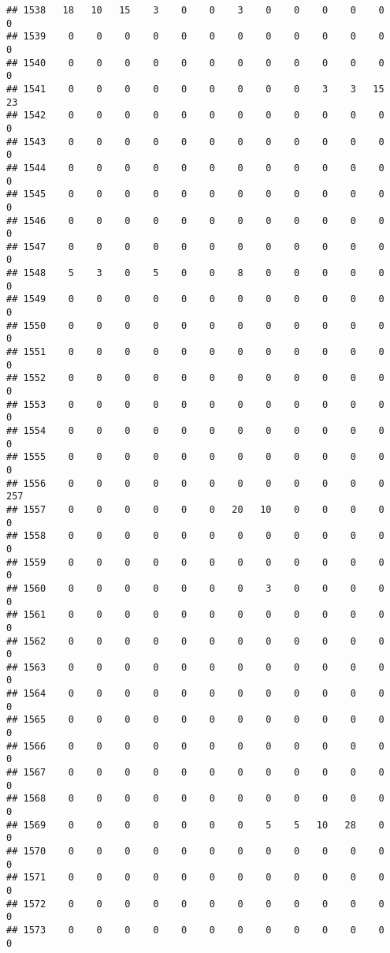 \documentclass[]{article}
\begin{document}
\begin{verbatim}
## 1538   18   10   15    3    0    0    3    0    0    0    0    0    0
## 1539    0    0    0    0    0    0    0    0    0    0    0    0    0
## 1540    0    0    0    0    0    0    0    0    0    0    0    0    0
## 1541    0    0    0    0    0    0    0    0    0    3    3   15   23
## 1542    0    0    0    0    0    0    0    0    0    0    0    0    0
## 1543    0    0    0    0    0    0    0    0    0    0    0    0    0
## 1544    0    0    0    0    0    0    0    0    0    0    0    0    0
## 1545    0    0    0    0    0    0    0    0    0    0    0    0    0
## 1546    0    0    0    0    0    0    0    0    0    0    0    0    0
## 1547    0    0    0    0    0    0    0    0    0    0    0    0    0
## 1548    5    3    0    5    0    0    8    0    0    0    0    0    0
## 1549    0    0    0    0    0    0    0    0    0    0    0    0    0
## 1550    0    0    0    0    0    0    0    0    0    0    0    0    0
## 1551    0    0    0    0    0    0    0    0    0    0    0    0    0
## 1552    0    0    0    0    0    0    0    0    0    0    0    0    0
## 1553    0    0    0    0    0    0    0    0    0    0    0    0    0
## 1554    0    0    0    0    0    0    0    0    0    0    0    0    0
## 1555    0    0    0    0    0    0    0    0    0    0    0    0    0
## 1556    0    0    0    0    0    0    0    0    0    0    0    0  257
## 1557    0    0    0    0    0    0   20   10    0    0    0    0    0
## 1558    0    0    0    0    0    0    0    0    0    0    0    0    0
## 1559    0    0    0    0    0    0    0    0    0    0    0    0    0
## 1560    0    0    0    0    0    0    0    3    0    0    0    0    0
## 1561    0    0    0    0    0    0    0    0    0    0    0    0    0
## 1562    0    0    0    0    0    0    0    0    0    0    0    0    0
## 1563    0    0    0    0    0    0    0    0    0    0    0    0    0
## 1564    0    0    0    0    0    0    0    0    0    0    0    0    0
## 1565    0    0    0    0    0    0    0    0    0    0    0    0    0
## 1566    0    0    0    0    0    0    0    0    0    0    0    0    0
## 1567    0    0    0    0    0    0    0    0    0    0    0    0    0
## 1568    0    0    0    0    0    0    0    0    0    0    0    0    0
## 1569    0    0    0    0    0    0    0    5    5   10   28    0    0
## 1570    0    0    0    0    0    0    0    0    0    0    0    0    0
## 1571    0    0    0    0    0    0    0    0    0    0    0    0    0
## 1572    0    0    0    0    0    0    0    0    0    0    0    0    0
## 1573    0    0    0    0    0    0    0    0    0    0    0    0    0

\end{verbatim}
\end{document}
